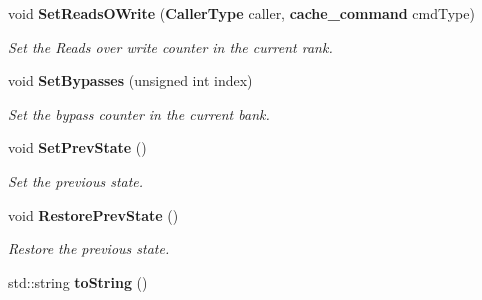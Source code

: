 \begin{CompactItemize}
void {\bf SetReadsOWrite} ({\bf CallerType} caller, {\bf cache\_\-command} cmdType)
\begin{CompactList}\small\item\em Set the Reads over write counter in the current rank. \item\end{CompactList}\item 
void {\bf SetBypasses} (unsigned int index)
\begin{CompactList}\small\item\em Set the bypass counter in the current bank. \item\end{CompactList}\item 
void {\bf SetPrevState} ()
\begin{CompactList}\small\item\em Set the previous state. \item\end{CompactList}\item 
void {\bf RestorePrevState} ()
\begin{CompactList}\small\item\em Restore the previous state. \item\end{CompactList}\item 
std::string {\bf toString} ()
\end{CompactItemize}
